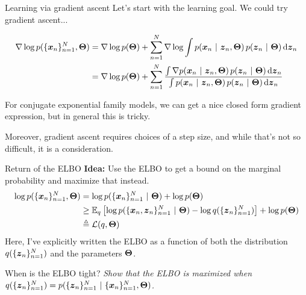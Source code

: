 \documentclass[aspectratio=169]{beamer}
\begin{document}
\begin{frame}{Learning via gradient ascent}
Let's start with the learning goal. We could try gradient ascent... 

\begin{align}
    \nabla \log p(\{\boldsymbol{x}_n\}_{n=1}^N, \boldsymbol{\Theta}) 
    &= \nabla \log p(\boldsymbol{\Theta}) + \sum_{n=1}^N 
    \nabla \log \int p(\boldsymbol{x}_n ~\vert~ \boldsymbol{z}_n, \boldsymbol{\Theta}) \, p(\boldsymbol{z}_n ~\vert~ \boldsymbol{\Theta}) \mathop{}\!\mathrm{d} \boldsymbol{z}_n \\
    &= \nabla \log p(\boldsymbol{\Theta}) + \sum_{n=1}^N 
    \frac{ \int \nabla p(\boldsymbol{x}_n ~\vert~ \boldsymbol{z}_n, \boldsymbol{\Theta}) \, p(\boldsymbol{z}_n ~\vert~ \boldsymbol{\Theta}) \mathop{}\!\mathrm{d} \boldsymbol{z}_n}{\int p(\boldsymbol{x}_n ~\vert~ \boldsymbol{z}_n, \boldsymbol{\Theta}) \, p(\boldsymbol{z}_n ~\vert~ \boldsymbol{\Theta}) \mathop{}\!\mathrm{d} \boldsymbol{z}_n }
\end{align}

For conjugate exponential family models, we can get a nice closed form gradient expression, but in general this is tricky.

Moreover, gradient ascent requires choices of a step size, and while that's not so difficult, it is a consideration.

\end{frame}

\begin{frame}[t]{Return of the ELBO}
\textbf{Idea: } Use the ELBO to get a bound on the marginal probability and maximize that instead.
\begin{align}
\log p(\{\boldsymbol{x}_n\}_{n=1}^N, \boldsymbol{\Theta}) &= \log p(\{\boldsymbol{x}_n\}_{n=1}^N ~\vert~ \boldsymbol{\Theta}) + \log p(\boldsymbol{\Theta}) \\
&\geq \mathbb{E}_q\left[ \log p(\{\boldsymbol{x}_n, \boldsymbol{z}_n\}_{n=1}^N ~\vert~ \boldsymbol{\Theta}) - \log q(\{\boldsymbol{z}_n\}_{n=1}^N) \right] + \log p(\boldsymbol{\Theta})\\
&\triangleq \mathcal{L}(q, \boldsymbol{\Theta})
\end{align}
Here, I've explicitly written the ELBO as a function of both the distribution $q(\{\boldsymbol{z}_n\}_{n=1}^N)$ and the parameters $\boldsymbol{\Theta}$.

\end{frame}

\begin{frame}[t]{When is the ELBO tight?}
\textit{Show that the ELBO is maximized when $q(\{\boldsymbol{z}_n\}_{n=1}^N) = p(\{\boldsymbol{z}_n\}_{n=1}^N ~\vert~ \{\boldsymbol{x}_n\}_{n=1}^N, \boldsymbol{\Theta})$.}
\end{frame}
\end{document}
